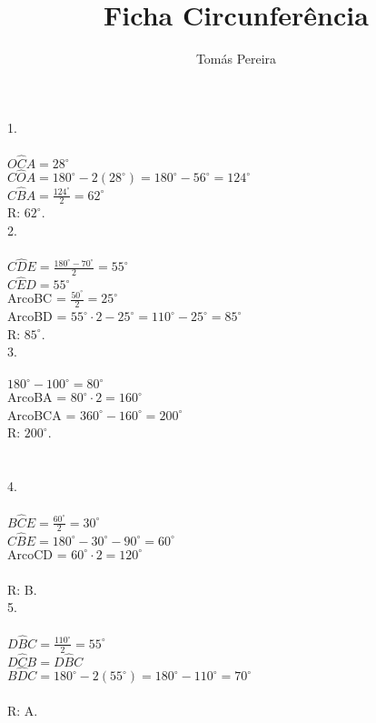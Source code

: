 \documentclass[12pt]{article}
\title{Ficha Circunferência}
\author{Tomás Pereira}
\begin{document}
\maketitle

1.\\\\
$O\hat{C}A=28^{\circ}$\\
$C\hat{O}A=180^{\circ}-2(28^{\circ})=180^{\circ}-56^{\circ}=124^{\circ}$\\
$C\hat{B}A=\frac{124^{\circ}}{2}=62^{\circ}$\\

R: $62^{\circ}$.\\



2.\\\\
$C\hat{D}E=\frac{180^{\circ}-70^{\circ}}{2}=55^{\circ}$\\
$C\hat{E}D=55^{\circ}$\\
ArcoBC = $\frac{50^{\circ}}{2}=25^{\circ}$\\
ArcoBD = $55^{\circ}\cdot2-25^{\circ}=110^{\circ}-25^{\circ}=85^{\circ}$\\

R: $85^{\circ}$.\\


3.\\\\
$180^{\circ}-100^{\circ}=80^{\circ}$\\
ArcoBA = $80^{\circ}\cdot2=160^{\circ}$\\
ArcoBCA = $360^{\circ}-160^{\circ}=200^{\circ}$\\
R: $200^{\circ}$.\\\\\\

4.\\\\
$B\hat{C}E=\frac{60^{\circ}}{2}=30^{\circ}$\\
$C\hat{B}E=180^{\circ}-30^{\circ}-90^{\circ}=60^{\circ}$\\
ArcoCD = $60^{\circ}\cdot2=120^{\circ}$\\\\
R: B.\\

5.\\\\
$D\hat{B}C=\frac{110^{\circ}}{2}=55^{\circ}$\\
$D\hat{C}B=D\hat{B}C$\\
$B\hat{D}C=180^{\circ}-2(55^{\circ})=180^{\circ}-110^{\circ}=70^{\circ}$\\\\
R: A.\\
\end{document}
